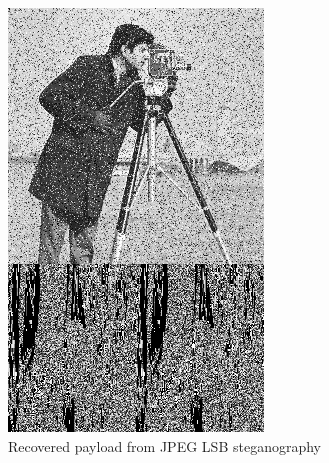 \documentclass{l4proj}
\begin{document}
\begin{figure}
    \centering
    \begin{subfigure}[b]{0.3\textwidth}
        \includegraphics[width=\textwidth]{images/jpeg_steganography_extracted.jpeg}
        \caption{Recovered payload from JPEG LSB steganography}
        \label{fig:jpeg_extracted_LSB}
    \end{subfigure}
    \begin{subfigure}[b]{0.3\textwidth}

\end{subfigure}
\end{figure}
\end{document}

